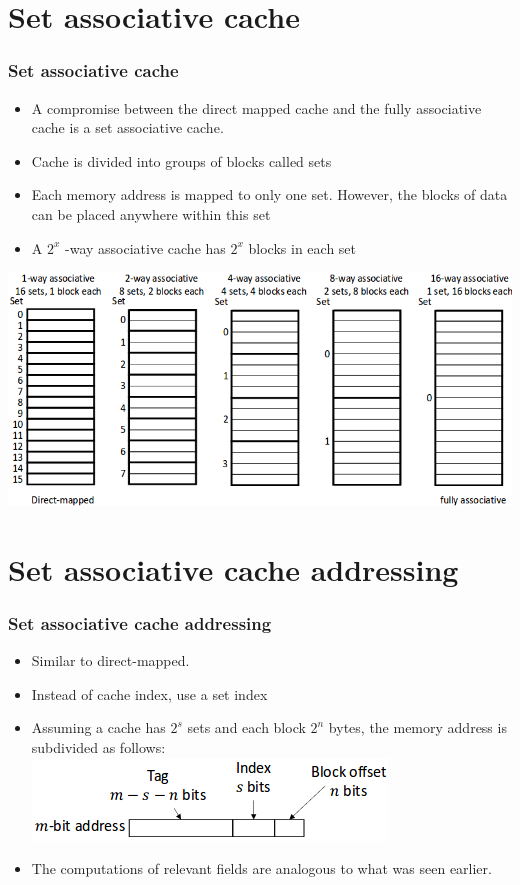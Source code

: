 \documentclass{beamer}
\begin{document}
\section{Set associative cache}
\begin{frame}
\frametitle{Set associative cache}
\begin{itemize}
\item A compromise between the direct mapped cache and the fully associative cache is a {\color{green}set associative cache}.
\item Cache is divided into groups of blocks called sets
\item Each memory address is mapped to only one set. However, the blocks of data can be placed anywhere within this set
\item A {\color{red}$2^x$ -way associative cache} has $2^x$ blocks in each set
\end{itemize}
\includegraphics[scale=0.34]{set.png}
\end{frame}
\section{Set associative cache addressing}
\begin{frame}
\frametitle{Set associative cache addressing}
\begin{itemize}
\item Similar to direct-mapped.
\item Instead of cache index, use a {\color{red}set index}
\item Assuming a cache has $2^s$ sets and each block $2^n$ bytes, the memory address is subdivided as follows:\\
\includegraphics[scale=0.5]{setadd.png}\\
\item The computations of relevant fields are analogous to what was seen earlier.
\end{itemize}
\end{frame}
\end{document}
